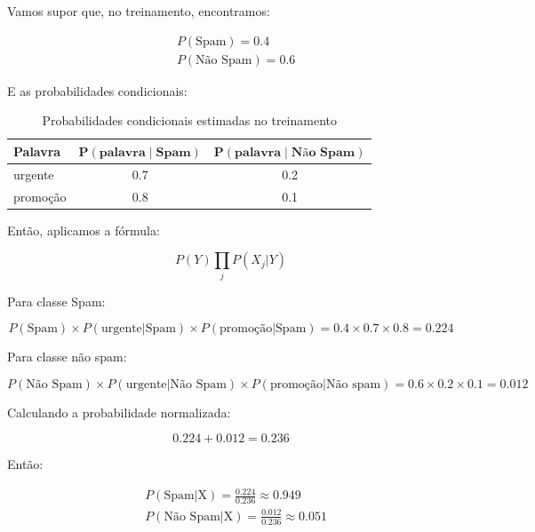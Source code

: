 \documentclass{article}
\begin{document}
Vamos supor que, no treinamento, encontramos:

\begin{align*}
    &P(\text{Spam}) = 0.4 \\
    &P(\text{Não Spam}) = 0.6
\end{align*}

E as probabilidades condicionais:

\begin{table}[h]
\centering
\begin{tabular}{lcc}
\hline
\textbf{Palavra} & 
$\mathbf{P(\text{palavra} \mid \text{Spam})}$ & 
$\mathbf{P(\text{palavra} \mid \text{Não Spam})}$ \\
\hline
urgente & 0.7 & 0.2 \\
promoção    & 0.8 & 0.1 \\
\hline
\end{tabular}
\caption{Probabilidades condicionais estimadas no treinamento}
\end{table}

Então, aplicamos a fórmula:

\begin{equation*}
    P(Y)\prod_{j}P(X_j|Y)
\end{equation*}

Para classe Spam:

\begin{equation*}
    P(\text{Spam})\times P(\text{urgente}|\text{Spam}) \times P(\text{promoção}|\text{Spam}) = 0.4 \times 0.7 \times 0.8 = 0.224
\end{equation*}

Para classe não spam:

\begin{equation*}
    P(\text{Não Spam}) \times P(\text{urgente}|\text{Não Spam}) \times P(\text{promoção}|\text{Não spam}) = 0.6 \times 0.2 \times 0.1 = 0.012
\end{equation*}

Calculando a probabilidade normalizada:

\begin{equation*}
    0.224 + 0.012 = 0.236
\end{equation*}

Então:

\begin{align*}
    &P(\text{Spam} | \text{X}) = \frac{0.224}{0.236} \approx 0.949 \\
    &P(\text{Não Spam} | \text{X}) = \frac{0.012}{0.236} \approx 0.051
\end{align*}
\end{document}

